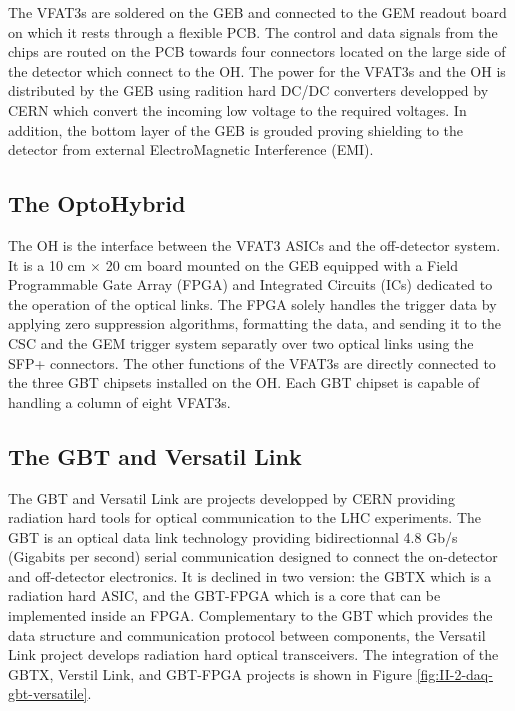       The VFAT3s are soldered on the GEB and connected to the GEM readout board on which it rests through a flexible PCB. The control and data signals from the chips are routed on the PCB towards four connectors located on the large side of the detector which connect to the OH. The power for the VFAT3s and the OH is distributed by the GEB using radition hard DC/DC converters developped by CERN which convert the incoming low voltage to the required voltages. In addition, the bottom layer of the GEB is grouded proving shielding to the detector from external ElectroMagnetic Interference (EMI).

    \subsection{The OptoHybrid}

      The OH is the interface between the VFAT3 ASICs and the off-detector system. It is a 10 cm $ \times $ 20 cm board mounted on the GEB equipped with a Field Programmable Gate Array (FPGA) and Integrated Circuits (ICs) dedicated to the operation of the optical links. The FPGA solely handles the trigger data by applying zero suppression algorithms, formatting the data, and sending it to the CSC and the GEM trigger system separatly over two optical links using the SFP+ connectors. The other functions of the VFAT3s are directly connected to the three GBT chipsets installed on the OH. Each GBT chipset is capable of handling a column of eight VFAT3s.

    \subsection{The GBT and Versatil Link}

      The GBT \cite{Moreira:1235836} and Versatil Link \cite{Soos:1609037} are projects developped by CERN providing radiation hard tools for optical communication to the LHC experiments. The GBT is an optical data link technology providing bidirectionnal 4.8 Gb/s (Gigabits per second) serial communication designed to connect the on-detector and off-detector electronics. It is declined in two version: the GBTX which is a radiation hard ASIC, and the GBT-FPGA which is a core that can be implemented inside an FPGA. Complementary to the GBT which provides the data structure and communication protocol between components, the Versatil Link project develops radiation hard optical transceivers. The integration of the GBTX, Verstil Link, and GBT-FPGA projects is shown in Figure \ref{fig:II-2-daq-gbt-versatile}. \\

